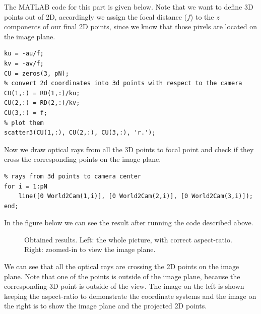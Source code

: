 \documentclass[a4paper, 10pt]{article}
\begin{document}
The MATLAB code for this part is given below. Note that we want to define 3D points out of 2D, accordingly we assign the focal distance ($f$) to the $z$ components of our final 2D points,  since we know that those pixels are located on the image plane.

\begin{lstlisting}
ku = -au/f;
kv = -av/f;
CU = zeros(3, pN);
% convert 2d coordinates into 3d points with respect to the camera
CU(1,:) = RD(1,:)/ku;
CU(2,:) = RD(2,:)/kv;
CU(3,:) = f;
% plot them
scatter3(CU(1,:), CU(2,:), CU(3,:), 'r.');
\end{lstlisting}

Now we draw optical rays from all the 3D points to focal point and check if they cross the corresponding points on the image plane.

\begin{lstlisting}
% rays from 3d points to camera center
for i = 1:pN
    line([0 World2Cam(1,i)], [0 World2Cam(2,i)], [0 World2Cam(3,i)]);
end;
\end{lstlisting}

In the figure below we can see the result after running the code described above. 
\begin{figure}[H]
\centering
{}
\caption{Obtained results. Left: the whole picture, with correct aspect-ratio. Right: zoomed-in to view the image plane.}
\label{fig:step12}
\end{figure}
We can see that all the optical rays are crossing the 2D points on the image plane. Note that one of the points is outside of the image plane, because the corresponding 3D point is outside of the view. The image on the left is shown keeping the aspect-ratio to demonstrate the coordinate systems and the image on the right is to show the image plane and the projected 2D points.
\end{document}
